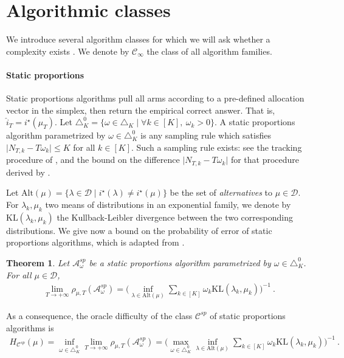 \documentclass{article}
\newcommand{\KL}{\mathrm{KL}}
\newcommand{\alt}{\mathrm{Alt}}
\newtheorem{theorem}{Theorem}
\begin{document}
\section{Algorithmic classes}
\label{sec:algorithmic_classes}

We introduce several algorithm classes for which we will ask whether a complexity exists . We denote by $\mathcal C_\infty$ the class of all algorithm families.

\paragraph{Static proportions}
\label{par:static_proportions}
Static proportions algorithms pull all arms according to a pre-defined allocation vector in the simplex, then return the empirical correct answer. That is, $\hat{i}_T = i^\star(\hat{\mu}_T)$.
Let $\triangle_K^0 = \{\omega \in \triangle_K \mid \forall k \in [K], \ \omega_k > 0\}$.
A static proportions algorithm parametrized by $\omega \in \triangle_K^0$ is any sampling rule which satisfies
$\vert N_{T,k} - T \omega_k \vert \le K$ for all $k \in [K]$. Such a sampling rule exists: see the tracking procedure of \cite{garivier2016optimal}, and the bound on the difference $\vert N_{T,k} - T \omega_k \vert$ for that procedure derived by \cite{degenne2020structure}.

Let $\alt(\mu) = \{\lambda \in \mathcal D \mid i^\star(\lambda) \ne i^\star(\mu)\}$ be the set of \emph{alternatives} to $\mu \in \mathcal D$. For $\lambda_k, \mu_k$ two means of distributions in an exponential family, we denote by $\KL(\lambda_k, \mu_k)$ the Kullback-Leibler divergence between the two corresponding distributions. We give now a bound on the probability of error of static proportions algorithms, which is adapted from \cite{glynn2004large}.

\begin{theorem}\label{thm:oracle_difficulty_sp}
Let $\mathcal A_\omega^{sp}$ be a static proportions algorithm parametrized by $\omega \in \triangle_K^0$. For all $\mu \in \mathcal D$,
\begin{align*}
\lim_{T \to +\infty}\rho_{\mu, T}(\mathcal A^{sp}_\omega) = \Big(\inf_{\lambda \in \alt(\mu)} \sum_{k \in [K]} \omega_k \KL(\lambda_k, \mu_k) \Big)^{-1}
\: .
\end{align*}
\end{theorem}
As a consequence, the oracle difficulty of the class $\mathcal C^{sp}$ of static proportions algorithms is
\begin{align*}
H_{\mathcal C^{sp}}(\mu)
= \inf_{\omega \in \triangle_K^0} \lim_{T \to +\infty}\rho_{\mu, T}(\mathcal A^{sp}_\omega)
= \Big( \max_{\omega \in \triangle_K^0} \inf_{\lambda \in \alt(\mu)} \sum_{k \in [K]} \omega_k \KL(\lambda_k, \mu_k) \Big)^{-1}
\: .
\end{align*}
\end{document}
